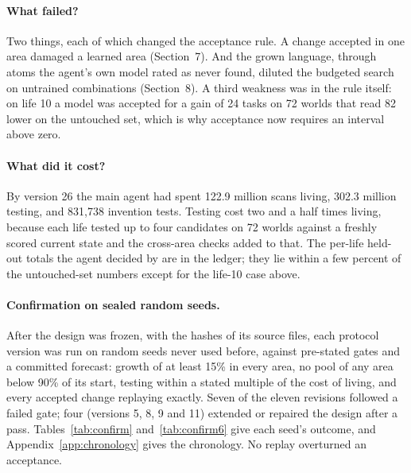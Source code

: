 \documentclass[11pt]{article}
\begin{document}
\paragraph{What failed?} Two things, each of which changed the acceptance rule. A change accepted in one area damaged a learned area (Section~7). And the grown language, through atoms the agent's own model rated as never found, diluted the budgeted search on untrained combinations (Section~8). A third weakness was in the rule itself: on life 10 a model was accepted for a gain of 24 tasks on 72 worlds that read 82 lower on the untouched set, which is why acceptance now requires an interval above zero.

\paragraph{What did it cost?} By version 26 the main agent had spent 122.9 million scans living, 302.3 million testing, and 831,738 invention tests. Testing cost two and a half times living, because each life tested up to four candidates on 72 worlds against a freshly scored current state and the cross-area checks added to that. The per-life held-out totals the agent decided by are in the ledger; they lie within a few percent of the untouched-set numbers except for the life-10 case above.

\paragraph{Confirmation on sealed random seeds.} After the design was frozen, with the hashes of its source files, each protocol version was run on random seeds never used before, against pre-stated gates and a committed forecast: growth of at least 15\% in every area, no pool of any area below 90\% of its start, testing within a stated multiple of the cost of living, and every accepted change replaying exactly. Seven of the eleven revisions followed a failed gate; four (versions 5, 8, 9 and 11) extended or repaired the design after a pass. Tables~\ref{tab:confirm} and~\ref{tab:confirm6} give each seed's outcome, and Appendix~\ref{app:chronology} gives the chronology. No replay overturned an acceptance.
\end{document}
